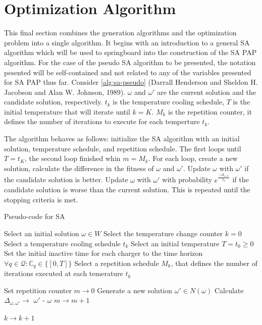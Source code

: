 \documentclass[11pt,a4paper,final]{article}
\newcommand{\C}{\mathbb{C}}                 %
\newcommand{\Qset}{\mathcal{Q}}             %
\begin{document}
\section{Optimization Algorithm}
\label{optimization-algorithm}
This final section combines the generation algorithms and the optimization problem into a single algorithm. It begins
with an introduction to a general SA algorithm which will be used to springboard into the construction of the SA PAP
algorithm. For the case of the pseudo SA algorithm to be presented, the notation pesented will be self-contained and not
related to any of the variables presented for SA PAP thus far. Consider \ref{alg:sa-pseudo} (Darrall Henderson and Sheldon H. Jacobson and Alan W. Johnson, 1989).
\(\omega\) and \(\omega'\) are the current solution and the candidate solution, respectively. \(t_k\) is the temperature cooling
schedule, \(T\) is the initial temperature that will iterate until \(k = K\). \(M_k\) is the repetition counter, it defines
the number of iterations to execute for each temperture \(t_k\).

The algorithm behaves as follows: initialize the SA algorithm with an initial solution, temperature schedule, and
repetition schedule. The first loops until \(T = t_K\), the second loop finished whin \(m = M_k\). For each loop, create a
new solution, calculate the difference in the fitness of \(\omega\) and \(\omega'\). Update \(\omega\) with \(\omega'\) if the candidate solution is
better. Update \(\omega\) with \(\omega'\) with probability \(e^{\frac{-\Delta_{\omega , \omega'}}{t_k}}\) if the candidate solution is worse than the
current solution. This is repeated until the stopping criteria is met.

\begin{algorithm}[H]
\caption{Pseudo-code for SA}
    \LinesNumbered

    \Begin
    {
        Select an initial solution $\omega \in W$\;
        Select the temperature change counter $k=0$\;
        Select a temperature cooling schedule $t_k$\;
        Select an initial temperature $T = t_0 \geq 0$\;
        Set the initial inactive time for each charger to the time horizon $\forall q \in \Qset : \C_q \in \{[0,T]\}$\;
        Select a repetition schedule $M_k$, that defines the number of iterations executed at each temerature $t_k$\;

        {
            Set repetition counter $m \rightarrow 0$\;
            {
                Generate a new solution $\omega' \in N(\omega)$\;
                Calculate $\Delta_{\omega,\omega'} \rightarrow$ \f{$\omega'$} - \f{$\omega$}\;
                $m \rightarrow m+1$\;
            }

        $k \rightarrow k+1$\;
        }
    }
\label{alg:sa-pseudo}
\end{algorithm}
\end{document}
